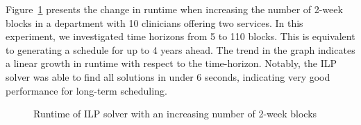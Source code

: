 Figure~\ref{fig:runtime-blocks} presents the change in runtime when increasing
the number of 2-week blocks in a department with 10
clinicians offering two services. In this experiment, we investigated time horizons
from 5 to 110 blocks. This is equivalent to generating a schedule for up to 4 years ahead.
The trend in the graph indicates a linear growth in runtime with respect to the time-horizon.
Notably, the ILP solver was able to find all solutions in under 6 seconds, indicating very 
good performance for long-term scheduling. 

\begin{figure}[h]
	\centering
	\def\svgwidth{\textwidth}
	\caption{Runtime of ILP solver with an increasing number of 2-week blocks}%
	
  \label{fig:runtime-blocks}
\end{figure}